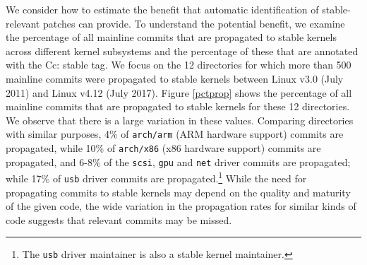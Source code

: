 We consider how to estimate the benefit that automatic identification of
stable-relevant patches can provide. To understand the potential benefit,
we examine the percentage of all mainline commits that are propagated to
stable kernels across different kernel subsystems and the percentage of
these that are annotated with the Cc: stable tag.  We focus on the 12
directories for which more than 500 mainline commits were propagated
to stable kernels between Linux v3.0 (July 2011) and Linux v4.12 (July
2017).  Figure \ref{pctprop} shows the percentage of all mainline commits
that are propagated to stable kernels for these 12 directories.  We observe
that there is a large variation in these values.  Comparing directories
with similar purposes, 4\% of {\tt arch/arm} (ARM hardware support) commits
are propagated, while 10\% of {\tt arch/x86} (x86 hardware support) commits
are propagated, and 6-8\% of the {\tt scsi}, {\tt gpu} and {\tt net} driver
commits are propagated; while 17\% of {\tt usb} driver commits are
propagated.\footnote{The {\tt usb} driver maintainer is also a stable kernel
  maintainer.}  While the need for propagating commits to stable kernels
may depend on the quality and maturity of the given code, the wide
variation in the propagation rates for similar kinds of code suggests that
relevant commits may be missed.

